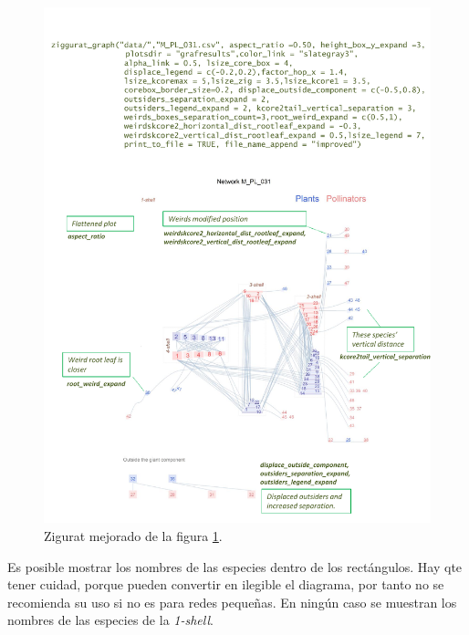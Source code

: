 \clearpage
\begin{figure}[hp!]
\centering
\includegraphics[scale=0.8]{ManFigs/M_PL_031_ziggurat_improved.pdf}
\caption {Zigurat mejorado de la figura \ref{fig:AKMAN_ziggurat_031}.}
\label{fig:AKMAN_ziggurat_031}
\end{figure}


\clearpage
Es posible mostrar los nombres de las especies dentro de los rectángulos. Hay qte tener cuidad, porque pueden convertir
en ilegible el diagrama, por tanto no se recomienda su uso si no es para redes pequeñas. En ningún caso se muestran los
nombres de las especies de la \textit{1-shell}.


